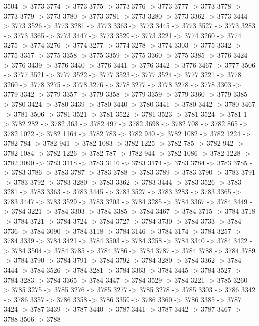 {	3504 -> 3773
	3774 -> 3773
	3775 -> 3773
	3776 -> 3773
	3777 -> 3773
	3778 -> 3773
	3779 -> 3773
	3780 -> 3773
	3781 -> 3773
	3280 -> 3773
	3362 -> 3773
	3444 -> 3773
	3526 -> 3773
	3281 -> 3773
	3363 -> 3773
	3445 -> 3773
	3527 -> 3773
	3283 -> 3773
	3365 -> 3773
	3447 -> 3773
	3529 -> 3773
	3221 -> 3774
	3260 -> 3774
	3275 -> 3774
	3276 -> 3774
	3277 -> 3774
	3278 -> 3774
	3303 -> 3775
	3342 -> 3775
	3357 -> 3775
	3358 -> 3775
	3359 -> 3775
	3360 -> 3775
	3385 -> 3776
	3424 -> 3776
	3439 -> 3776
	3440 -> 3776
	3441 -> 3776
	3442 -> 3776
	3467 -> 3777
	3506 -> 3777
	3521 -> 3777
	3522 -> 3777
	3523 -> 3777
	3524 -> 3777
	3221 -> 3778
	3260 -> 3778
	3275 -> 3778
	3276 -> 3778
	3277 -> 3778
	3278 -> 3778
	3303 -> 3779
	3342 -> 3779
	3357 -> 3779
	3358 -> 3779
	3359 -> 3779
	3360 -> 3779
	3385 -> 3780
	3424 -> 3780
	3439 -> 3780
	3440 -> 3780
	3441 -> 3780
	3442 -> 3780
	3467 -> 3781
	3506 -> 3781
	3521 -> 3781
	3522 -> 3781
	3523 -> 3781
	3524 -> 3781
	1 -> 3782
	282 -> 3782
	363 -> 3782
	497 -> 3782
	3698 -> 3782
	708 -> 3782
	865 -> 3782
	1022 -> 3782
	1164 -> 3782
	783 -> 3782
	940 -> 3782
	1082 -> 3782
	1224 -> 3782
	784 -> 3782
	941 -> 3782
	1083 -> 3782
	1225 -> 3782
	785 -> 3782
	942 -> 3782
	1084 -> 3782
	1226 -> 3782
	787 -> 3782
	944 -> 3782
	1086 -> 3782
	1228 -> 3782
	3090 -> 3783
	3118 -> 3783
	3146 -> 3783
	3174 -> 3783
	3784 -> 3783
	3785 -> 3783
	3786 -> 3783
	3787 -> 3783
	3788 -> 3783
	3789 -> 3783
	3790 -> 3783
	3791 -> 3783
	3792 -> 3783
	3280 -> 3783
	3362 -> 3783
	3444 -> 3783
	3526 -> 3783
	3281 -> 3783
	3363 -> 3783
	3445 -> 3783
	3527 -> 3783
	3283 -> 3783
	3365 -> 3783
	3447 -> 3783
	3529 -> 3783
	3203 -> 3784
	3285 -> 3784
	3367 -> 3784
	3449 -> 3784
	3221 -> 3784
	3303 -> 3784
	3385 -> 3784
	3467 -> 3784
	3715 -> 3784
	3718 -> 3784
	3721 -> 3784
	3724 -> 3784
	3727 -> 3784
	3730 -> 3784
	3733 -> 3784
	3736 -> 3784
	3090 -> 3784
	3118 -> 3784
	3146 -> 3784
	3174 -> 3784
	3257 -> 3784
	3339 -> 3784
	3421 -> 3784
	3503 -> 3784
	3258 -> 3784
	3340 -> 3784
	3422 -> 3784
	3504 -> 3784
	3785 -> 3784
	3786 -> 3784
	3787 -> 3784
	3788 -> 3784
	3789 -> 3784
	3790 -> 3784
	3791 -> 3784
	3792 -> 3784
	3280 -> 3784
	3362 -> 3784
	3444 -> 3784
	3526 -> 3784
	3281 -> 3784
	3363 -> 3784
	3445 -> 3784
	3527 -> 3784
	3283 -> 3784
	3365 -> 3784
	3447 -> 3784
	3529 -> 3784
	3221 -> 3785
	3260 -> 3785
	3275 -> 3785
	3276 -> 3785
	3277 -> 3785
	3278 -> 3785
	3303 -> 3786
	3342 -> 3786
	3357 -> 3786
	3358 -> 3786
	3359 -> 3786
	3360 -> 3786
	3385 -> 3787
	3424 -> 3787
	3439 -> 3787
	3440 -> 3787
	3441 -> 3787
	3442 -> 3787
	3467 -> 3788
	3506 -> 3788
}
